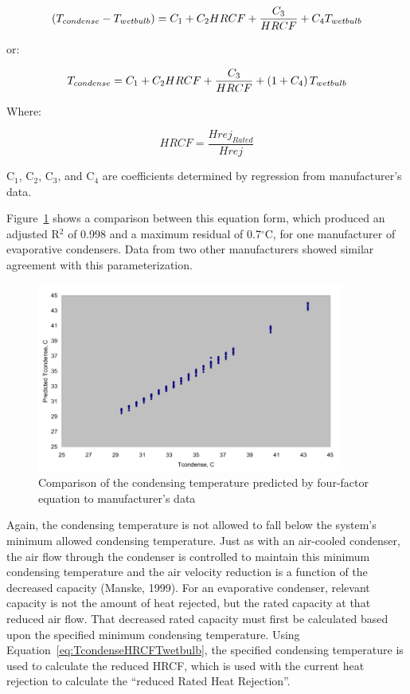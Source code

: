 \begin{equation}
\left(T_{condense} - T_{wetbulb}\right) = {C_1} + {C_2}{HRCF} + \frac{C_3}{HRCF} + {C_4}{T_{wetbulb}}
\end{equation}

or:

\begin{equation}
T_{condense} = {C_1} + {C_2}{HRCF} + \frac{C_3}{HRCF} + \left(1 + C_4\right)T_{wetbulb}
\label{eq:TcondenseHRCFTwetbulb}
\end{equation}

Where:

\begin{equation}
HRCF = \frac{Hrej_{Rated}}{Hrej}
\end{equation}


C\(_{1}\), C\(_{2}\), C\(_{3}\), and C\(_{4}\) are coefficients determined by regression from manufacturer's data.

Figure~\ref{fig:comparison-of-the-condensing-temperature} shows a comparison between this equation form, which produced an adjusted R\(^{2}\) of 0.998 and a maximum residual of 0.7\(^{\circ}\)C, for one manufacturer of evaporative condensers. Data from two other manufacturers showed similar agreement with this parameterization.

\begin{figure}[hbtp] %
\centering
\includegraphics[width=0.9\textwidth, height=0.9\textheight, keepaspectratio=true]{media/image6301.svg.png}
\caption{Comparison of the condensing temperature predicted by four-factor equation to manufacturer's data \protect \label{fig:comparison-of-the-condensing-temperature}}
\end{figure}

Again, the condensing temperature is not allowed to fall below the system's minimum allowed condensing temperature. Just as with an air-cooled condenser, the air flow through the condenser is controlled to maintain this minimum condensing temperature and the air velocity reduction is a function of the decreased capacity (Manske, 1999). For an evaporative condenser, relevant capacity is not the amount of heat rejected, but the rated capacity at that reduced air flow. That decreased rated capacity must first be calculated based upon the specified minimum condensing temperature. Using Equation~\ref{eq:TcondenseHRCFTwetbulb}, the specified condensing temperature is used to calculate the reduced HRCF, which is used with the current heat rejection to calculate the ``reduced Rated Heat Rejection''.

